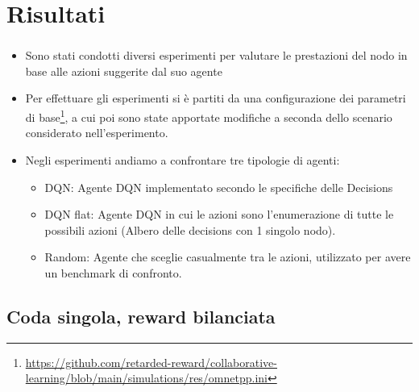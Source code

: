 \documentclass[compress]{beamer}
\begin{document}
\section{Risultati}
\begin{frame}
    \frametitle{\secname}
    \begin{itemize}
        \item Sono stati condotti diversi esperimenti per valutare le prestazioni del nodo in base 
        alle azioni suggerite dal suo agente
        \item Per effettuare gli esperimenti si è partiti da una configurazione dei parametri di 
        base\footnote{\href{https://github.com/retarded-reward/collaborative-learning/blob/main/simulations/res/omnetpp.ini}{https://github.com/retarded-reward/collaborative-learning/blob/main/simulations/res/omnetpp.ini}},
        a cui poi sono state apportate modifiche a seconda dello scenario considerato
        nell'esperimento.
        \item Negli esperimenti andiamo a confrontare tre tipologie di agenti:
        \begin{itemize}
            \item DQN: Agente DQN implementato secondo le specifiche delle Decisions
            \item DQN flat: Agente DQN in cui le azioni sono l'enumerazione di tutte
             le possibili azioni (Albero delle decisions con 1 singolo nodo). 
            \item Random: Agente che sceglie casualmente tra le azioni,
             utilizzato per avere un benchmark di confronto.
        \end{itemize}
    \end{itemize}
\end{frame}

\subsection{Coda singola, reward bilanciata}
\end{document}
